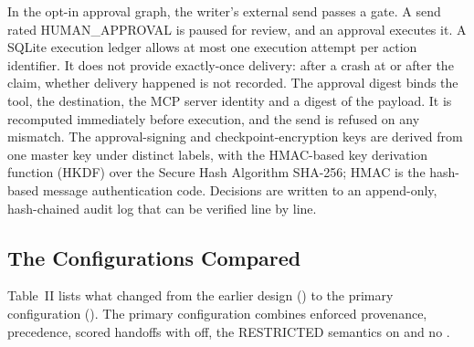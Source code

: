 \documentclass{ieeeaccess}
\begin{document}
In the opt-in approval graph, the writer's external send passes a gate. A send rated HUMAN\_APPROVAL is paused for review, and an approval executes it. A SQLite execution ledger allows at most one execution attempt per action identifier. It does not provide exactly-once delivery: after a crash at or after the claim, whether delivery happened is not recorded. %
The approval digest binds the tool, the destination, the MCP server identity and a digest of the payload. It is recomputed immediately before execution, and the send is refused on any mismatch. %
The approval-signing and checkpoint-encryption keys are derived from one master key under distinct labels, with the HMAC-based key derivation function (HKDF) over the Secure Hash Algorithm SHA-256; HMAC is the hash-based message authentication code. %
Decisions are written to an append-only, hash-chained audit log that can be verified line by line. %


\subsection{The Configurations Compared}

Table~II lists what changed from the earlier design () to the primary configuration (). The primary configuration combines enforced provenance,  precedence, scored handoffs with  off, the RESTRICTED semantics on and no . %
\end{document}
